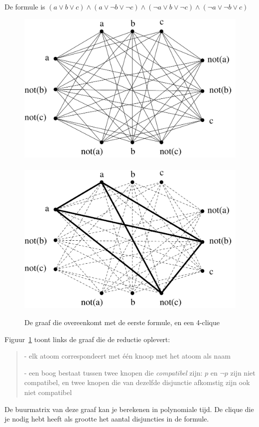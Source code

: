 \begin{vb}
De formule is 
$(a \vee b \vee c) \wedge (a \vee \neg b \vee \neg c) \wedge (\neg a \vee b \vee \neg c) \wedge (\neg a \vee \neg b \vee c)$

\begin{figure}[h]
\begin{center}
\includegraphics[height=0.2\textheight,keepaspectratio]{satclique}
~~~~~~~~~\includegraphics[height=0.2\textheight,keepaspectratio]{satcliquesol}
\caption{De graaf die overeenkomt met de eerste formule, en een 4-clique}\label{satclique}
\end{center}
\end{figure}

Figuur~\ref{satclique} toont links de graaf die de reductie oplevert:
\begin{verse}
- elk atoom correspondeert met \'{e}\'{e}n knoop met het atoom als naam

- een boog bestaat tussen twee knopen die {\em compatibel} zijn: $p$
en $\neg p$ zijn niet compatibel, en twee knopen die van dezelfde
disjunctie afkomstig zijn ook niet compatibel
\end{verse}

De buurmatrix van deze graaf kan je berekenen in polynomiale tijd. De
clique die je nodig hebt heeft als grootte het aantal disjuncties in
de formule.
\end{vb}

